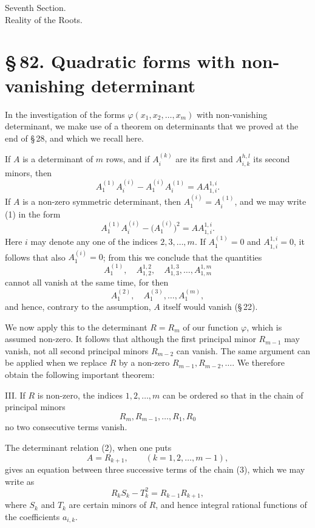 \documentclass[11pt]{article}
\providecommand{\sect}[2]{\section*{\S\,#1. #2}}
\begin{document}
\begin{center}
{\large Seventh Section.}\\[0.6em]
{\Large Reality of the Roots.}
\end{center}

\sect{82}{Quadratic forms with non-vanishing determinant}

In the investigation of the forms $\varphi(x_1,x_2,\ldots,x_m)$ with non-vanishing determinant, we make use of a theorem on determinants that we proved at the end of \S\,28, and which we recall here.

If $A$ is a determinant of $m$ rows, and if $A_i^{(k)}$ are its first and $A_{i,k}^{h,l}$ its second minors, then
\begin{equation}
        A_1^{(1)}A_i^{(i)}-A_1^{(i)}A_i^{(1)}=A A_{1,i}^{1,i}.
\tag{1}
\end{equation}
If $A$ is a non-zero symmetric determinant, then $A_1^{(i)}=A_i^{(1)}$, and we may write (1) in the form
\begin{equation}
        A_1^{(1)}A_i^{(i)}-\bigl(A_1^{(i)}\bigr)^2=A A_{1,i}^{1,i}.
\tag{2}
\end{equation}
Here $i$ may denote any one of the indices $2,3,\ldots,m$. If $A_1^{(1)}=0$ and $A_{1,i}^{1,i}=0$, it follows that also $A_1^{(i)}=0$; from this we conclude that the quantities
\[
        A_1^{(1)},\quad A_{1,2}^{1,2},\quad A_{1,3}^{1,3},\ldots, A_{1,m}^{1,m}
\]
cannot all vanish at the same time, for then
\[
        A_1^{(2)},\quad A_1^{(3)},\ldots,A_1^{(m)},
\]
and hence, contrary to the assumption, $A$ itself would vanish (\S\,22).

We now apply this to the determinant $R=R_m$ of our function $\varphi$, which is assumed non-zero. It follows that although the first principal minor $R_{m-1}$ may vanish, not all second principal minors $R_{m-2}$ can vanish. The same argument can be applied when we replace $R$ by a non-zero $R_{m-1},R_{m-2},\ldots$. We therefore obtain the following important theorem:

III. If $R$ is non-zero, the indices $1,2,\ldots,m$ can be ordered so that in the chain of principal minors
\begin{equation}
        R_m, R_{m-1},\ldots,R_1,R_0
\tag{3}
\end{equation}
no two consecutive terms vanish.

The determinant relation (2), when one puts
\[
        A=R_{k+1},\qquad (k=1,2,
\ldots,m-1),
\]
gives an equation between three successive terms of the chain (3), which we may write as
\begin{equation}
        R_kS_k-T_k^2=R_{k-1}R_{k+1},
\tag{4}
\end{equation}
where $S_k$ and $T_k$ are certain minors of $R$, and hence integral rational functions of the coefficients $a_{i,k}$.
\end{document}
